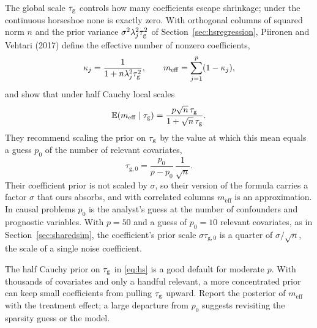 The global scale $\tau_{\mathrm{g}}$ controls how many coefficients escape shrinkage; under the continuous horseshoe none is exactly zero. With orthogonal columns of squared norm $n$ and the prior variance $\sigma^2\lambda_j^2\tau_{\mathrm{g}}^2$ of Section~\ref{sec:hsregression}, Piironen and Vehtari (2017) define the effective number of nonzero coefficients,
\[
\kappa_j = \frac{1}{1 + n\lambda_j^2\tau_{\mathrm{g}}^2}, \qquad m_{\mathrm{eff}} = \sum_{j=1}^p (1 - \kappa_j),
\]
and show that under half Cauchy local scales
\[
\mathbb{E}(m_{\mathrm{eff}} \mid \tau_{\mathrm{g}}) = \frac{p\sqrt{n}\,\tau_{\mathrm{g}}}{1 + \sqrt{n}\,\tau_{\mathrm{g}}}.
\]
They recommend scaling the prior on $\tau_{\mathrm{g}}$ by the value at which this mean equals a guess $p_0$ of the number of relevant covariates,
\[
\tau_{\mathrm{g},0} = \frac{p_0}{p - p_0}\,\frac{1}{\sqrt{n}}.
\]
Their coefficient prior is not scaled by $\sigma$, so their version of the formula carries a factor $\sigma$ that ours absorbs, and with correlated columns $m_{\mathrm{eff}}$ is an approximation. In causal problems $p_0$ is the analyst's guess at the number of confounders and prognostic variables. With $p = 50$ and a guess of $p_0 = 10$ relevant covariates, as in Section~\ref{sec:sharedsim}, the coefficient's prior scale $\sigma\tau_{\mathrm{g},0}$ is a quarter of $\sigma/\sqrt{n}$, the scale of a single noise coefficient.

The half Cauchy prior on $\tau_{\mathrm{g}}$ in \eqref{eq:hs} is a good default for moderate $p$. With thousands of covariates and only a handful relevant, a more concentrated prior can keep small coefficients from pulling $\tau_{\mathrm{g}}$ upward. Report the posterior of $m_{\mathrm{eff}}$ with the treatment effect; a large departure from $p_0$ suggests revisiting the sparsity guess or the model.

